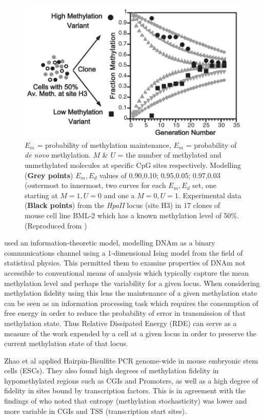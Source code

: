 \documentclass[]{book}
\begin{document}
\begin{figure}

{\centering \includegraphics[width=0.7\linewidth]{figs/Riggs2004PNASfig2DNAmFidelity} 

}

\caption{\(E_m\) = probability of methylation maintenance, \(E_m\) = probability of \emph{de novo} methylation. \(M\) \& \(U\) = the number of methylated and unmethylated molecules at specific CpG sites respectively. Modelling (\textbf{Grey points}) \(E_m,E_d\) values of 0.90,0.10; 0.95,0.05; 0.97,0.03 (outermost to innermost, two curves for each \(E_m,E_d\) set, one starting at \(M=1,U=0\) and one a \(M=0,U=1\). Experimental data (\textbf{Black points}) from the \emph{HpaII} locus (site H3) in 17 clones of mouse cell line BML-2 which has a known methylation level of 50\%. (Reproduced from \citep{Riggs2004a})}\label{fig:Riggs2004PNASfig2DNAmFidelity}
\end{figure}



\citet{Jenkinson2017} used an information-theoretic model, modelling DNAm as a binary communications channel using a 1-dimensional Ising model from the field of statistical physics. This permitted them to examine properties of DNAm not accessible to conventional means of analysis which typically capture the mean methylation level and perhaps the variability for a given locus. When considering methylation fidelity using this lens the maintenance of a given methylation state can be seen as an information processing task which requires the consumption of free energy in order to reduce the probability of error in transmission of that methylation state. Thus Relative Dissipated Energy (RDE) can serve as a measure of the work expended by a cell at a given locus in order to preserve the current methylation state of that locus.

Zhao et al \citep{Zhao2014} applied Hairpin-Bisulfite PCR genome-wide in mouse embryonic stem cells (ESCs). They also found high degrees of methylation fidelity in hypomethylated regions such as CGIs and Promoters, as well as a high degree of fidelity in sites bound by transcription factors. This is in agreement with the findings of \citet{Jenkinson2017} who noted that entropy (methylation stochasticity) was lower and more variable in CGIs and TSS (transcription start sites).
\end{document}

